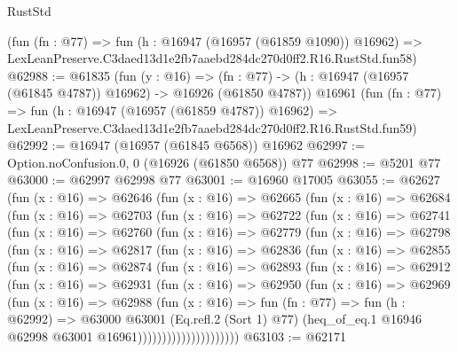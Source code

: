 \begin{lexlean}{RustStd}
\begin{coremodule}
    (fun (fn : @77) =>
    fun (h : @16947 (@16957 (@61859 @1090)) @16962) =>
    LexLeanPreserve.C3daed13d1e2fb7aaebd284dc270d0ff2.R16.RustStd.fun58)
@62988 := @61835
    (fun (y : @16) =>
    (fn : @77) -> (h : @16947 (@16957 (@61845 @4787)) @16962) -> @16926 (@61850 @4787))
    @16961
    (fun (fn : @77) =>
    fun (h : @16947 (@16957 (@61859 @4787)) @16962) =>
    LexLeanPreserve.C3daed13d1e2fb7aaebd284dc270d0ff2.R16.RustStd.fun59)
@62992 := @16947 (@16957 (@61845 @6568)) @16962
@62997 := Option.noConfusion.{0, 0} (@16926 (@61850 @6568)) @77
@62998 := @5201 @77
@63000 := @62997 @62998 @77
@63001 := @16960 @17005
@63055 := @62627
    (fun (x : @16) =>
    @62646
      (fun (x : @16) =>
      @62665
        (fun (x : @16) =>
        @62684
          (fun (x : @16) =>
          @62703
            (fun (x : @16) =>
            @62722
              (fun (x : @16) =>
              @62741
                (fun (x : @16) =>
                @62760
                  (fun (x : @16) =>
                  @62779
                    (fun (x : @16) =>
                    @62798
                      (fun (x : @16) =>
                      @62817
                        (fun (x : @16) =>
                        @62836
                          (fun (x : @16) =>
                          @62855
                            (fun (x : @16) =>
                            @62874
                              (fun (x : @16) =>
                              @62893
                                (fun (x : @16) =>
                                @62912
                                  (fun (x : @16) =>
                                  @62931
                                    (fun (x : @16) =>
                                    @62950
                                      (fun (x : @16) =>
                                      @62969
                                        (fun (x : @16) =>
                                        @62988
                                          (fun (x : @16) =>
                                          fun (fn : @77) =>
                                          fun (h : @62992) =>
                                          @63000
                                            @63001
                                            (Eq.refl.{2} (Sort 1) @77)
                                            (heq_of_eq.{1}
                                              @16946
                                              @62998
                                              @63001
                                              @16961)))))))))))))))))))))
@63103 := @62171

\end{coremodule}
\end{lexlean}
